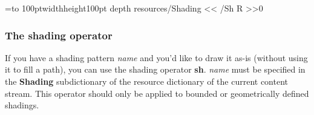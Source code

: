 \immediate{}

\immediate{}

\bgroup
{}=\hbox to 100pt{\vrule width\z@ height100pt depth\z@%
}
\pdfxform resources{/Shading << /Sh \the\pdflastobj{} R >>}0

\centerline{\pdfrefxform\pdflastxform}
\egroup

\subsubsection{The shading operator}

If you have a shading pattern {\it name} and you'd like to draw it as-is (without using it to fill a path),
you can use the shading operator {\bf sh}.
{\it name} must be specified in the {\bf Shading} subdictionary of the resource dictionary of the current
content stream.
This operator should only be applied to bounded or geometrically defined shadings.

